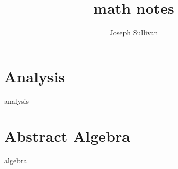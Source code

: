 \documentclass{report}
\title{math notes}
\author{Joseph Sullivan}
\begin{document}
\maketitle
\tableofcontents

\newpage

\part{Analysis}
{analysis}

\part{Abstract Algebra}
{algebra}
\end{document}
